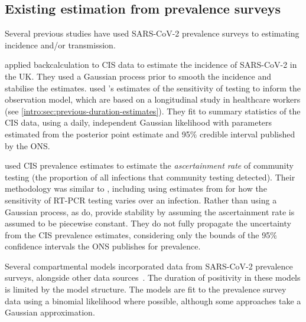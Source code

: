 \documentclass[thesis.tex]{subfiles}
\begin{document}
\subsection{Existing estimation from prevalence surveys}

Several previous studies have used SARS-CoV-2 prevalence surveys to estimating incidence and/or transmission.

\Textcite{abbottCISincidence} applied backcalculation to CIS data to estimate the incidence of SARS-CoV-2 in the UK.
They used a Gaussian process prior to smooth the incidence and stabilise the estimates.
\Textcite{abbottCISincidence} used \textcite{hellewellPCRSensitivity}'s estimates of the sensitivity of testing to inform the observation model, which are based on a longitudinal study in healthcare workers (see \cref{intro:sec:previous-duration-estimates}).
They fit to summary statistics of the CIS data, using a daily, independent Gaussian likelihood with parameters estimated from the posterior point estimate and 95\% credible interval published by the ONS.

\Textcite{colmanAscertainment} used CIS prevalence estimates to estimate the \emph{ascertainment rate} of community testing (the proportion of all infections that community testing detected).
Their methodology was similar to \textcite{abbottCISincidence}, including using estimates from \textcite{hellewellPCRSensitivity} for how the sensitivity of RT-PCR testing varies over an infection.
Rather than using a Gaussian process, as \textcite{abbottCISincidence} do, \textcite{colmanAscertainment} provide stability by assuming the ascertainment rate is assumed to be piecewise constant.
They do not fully propagate the uncertainty from the CIS prevalence estimates, considering only the bounds of the 95\% confidence intervals the ONS publishes for prevalence.

Several compartmental models incorporated data from SARS-CoV-2 prevalence surveys, alongside other data sources~\autocite{daviesAssociation,ironsEstimating,knockKey,nicholsonImproving,pooleyEstimation,birrellRTM2}.
The duration of positivity in these models is limited by the model structure.
The models are fit to the prevalence survey data using a binomial likelihood where possible, although some approaches take a Gaussian approximation.
\end{document}
